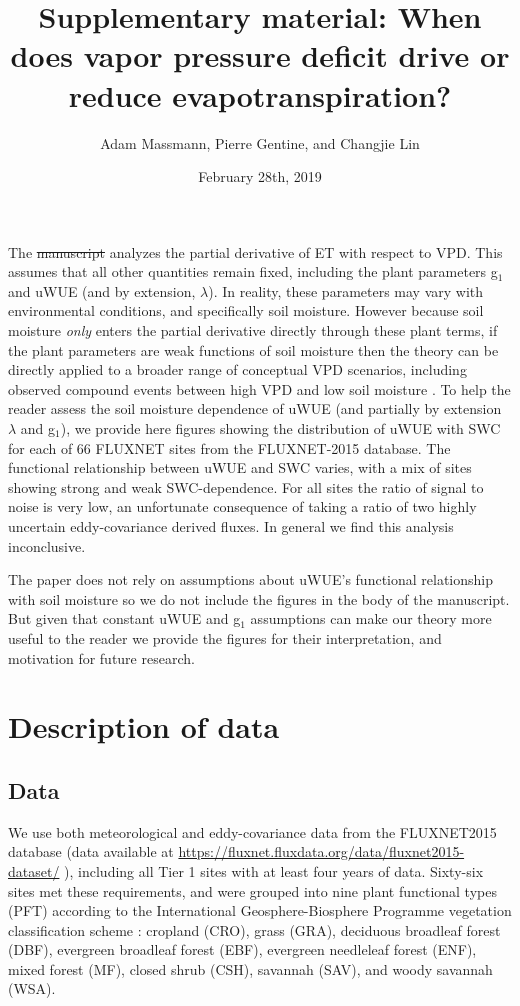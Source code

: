 \documentclass[12pt]{article}
\title{Supplementary material: When does vapor pressure deficit drive or
  reduce evapotranspiration?}
\author{Adam Massmann, Pierre Gentine, and Changjie Lin}
\date{February 28th, 2019}
\providecommand{\DIFaddtex}[1]{{\protect\color{blue}\uwave{#1}}} %
\providecommand{\DIFdeltex}[1]{{\protect\color{red}\sout{#1}}}                      %
\providecommand{\DIFaddbegin}{} %
\providecommand{\DIFaddend}{} %
\providecommand{\DIFdelbegin}{} %
\providecommand{\DIFdelend}{} %
\providecommand{\DIFadd}[1]{\texorpdfstring{\DIFaddtex{#1}}{#1}} %
\providecommand{\DIFdel}[1]{\texorpdfstring{\DIFdeltex{#1}}{}} %
\begin{document}
\maketitle

The \DIFdelbegin \DIFdel{manuscript }\DIFdelend \DIFaddbegin \DIFadd{paper }\DIFaddend analyzes the partial derivative of ET with respect to
VPD. This assumes that all other quantities remain fixed, including the
plant parameters g$_1$ and uWUE (and by extension, $\lambda$). In
reality, these parameters may vary with environmental conditions, and
specifically soil moisture. However because soil moisture
\textit{only} enters the partial derivative directly through these
plant terms, if the plant parameters are weak functions of soil
moisture then the theory can be directly applied to a broader range of
conceptual VPD scenarios, including observed compound events between
high VPD and low soil moisture \citep{Zhou_2019}. To help the reader
assess the soil moisture dependence of uWUE (and partially by
extension $\lambda$ and g$_1$), we provide here figures showing the
distribution of uWUE with SWC for each of 66 FLUXNET sites from the
FLUXNET-2015 database. The functional relationship between uWUE and
SWC varies, with a mix of sites showing strong and weak
SWC-dependence. For all sites the ratio of signal to noise is very
low, an unfortunate consequence of taking a ratio of two highly
uncertain eddy-covariance derived fluxes. In general we find this
analysis inconclusive.

The paper does not rely on assumptions about uWUE's functional
relationship with soil moisture so we do not include the figures in
the body of the manuscript. But given that constant uWUE and g$_1$
assumptions can make our theory more useful to the reader we provide
the figures for their interpretation, and motivation for future
research.

\section{Description of data}
\subsection{Data}
\label{data}
We use both meteorological and eddy-covariance data from the
FLUXNET2015 database (data available at \sloppy
\url{https://fluxnet.fluxdata.org/data/fluxnet2015-dataset/} \sloppy),
including all Tier 1 sites with at least four years of data. Sixty-six
sites met these requirements, and were grouped into nine plant
functional types (PFT) according to the International
Geosphere-Biosphere Programme vegetation classification scheme
\citep{Loveland_1999}: cropland (CRO), grass (GRA), deciduous
broadleaf forest (DBF), evergreen broadleaf forest (EBF), evergreen
needleleaf forest (ENF), mixed forest (MF), closed shrub (CSH),
savannah (SAV), and woody savannah (WSA).
\end{document}
